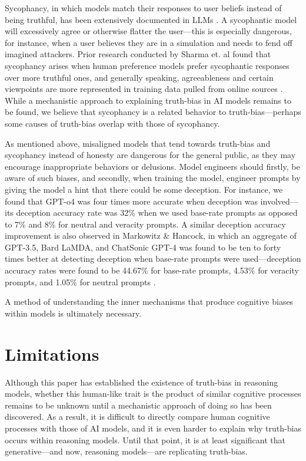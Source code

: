 \documentclass{article}
\begin{document}
Sycophancy, in which models match their responses to user beliefs instead of being truthful, has been extensively documented in LLMs \citep{chen2025yesmentruthtellersaddressingsycophancy}. A sycophantic model will excessively agree or otherwise flatter the user---this is especially dangerous, for instance, when a user believes they are in a simulation and needs to fend off imagined attackers. Prior research conducted by Sharma et. al \citep{sharma2023understandingsycophancylanguagemodels} found that sycophancy arises when human preference models prefer sycophantic responses over more truthful ones, and generally speaking, agreeableness and certain viewpoints are more represented in training data pulled from online sources \citep{malmqvist2024sycophancylargelanguagemodels}. While a mechanistic approach to explaining truth-bias in AI models remains to be found, we believe that sycophancy is a related behavior to truth-bias---perhaps some causes of truth-bias overlap with those of sycophancy.

As mentioned above, misaligned models that tend towards truth-bias and sycophancy instead of honesty are dangerous for the general public, as they may encourage inappropriate behaviors or delusions. Model engineers should firstly, be aware of such biases, and secondly, when training the model, engineer prompts by giving the model a hint that there could be some deception. For instance, we found that GPT-o4 was four times more accurate when deception was involved---its deception accuracy rate was 32\% when we used base-rate prompts as opposed to 7\% and 8\% for neutral and veracity prompts. A similar deception accuracy improvement is also observed in Markowitz \& Hancock, in which an aggregate of GPT-3.5, Bard LaMDA, and ChatSonic GPT-4 was found to be ten to forty times better at detecting deception when base-rate prompts were used---deception accuracy rates were found to be 44.67\% for base-rate prompts, 4.53\% for veracity prompts, and 1.05\% for neutral prompts \citep{markowitz_generative_2024}.

A method of understanding the inner mechanisms that produce cognitive biases within models is ultimately necessary.

\section{Limitations}

Although this paper has established the existence of truth-bias in reasoning models, whether this human-like trait is the product of similar cognitive processes remains to be unknown until a mechanistic approach of doing so has been discovered. As a result, it is difficult to directly compare human cognitive processes with those of AI models, and it is even harder to explain why truth-bias occurs within reasoning models. Until that point, it is at least significant that generative---and now, reasoning models---are replicating truth-bias.
\end{document}
